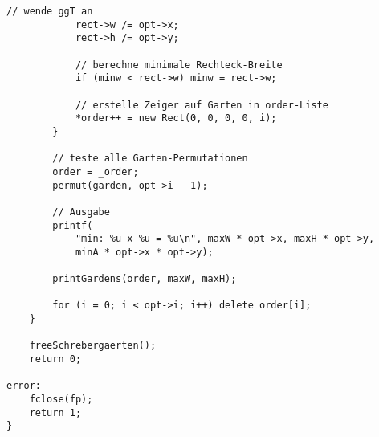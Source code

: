 \documentclass[a4paper,10pt,ngerman]{scrartcl}
\begin{document}
\begin{lstlisting}[frame=single]
            // wende ggT an
            rect->w /= opt->x;
            rect->h /= opt->y;

            // berechne minimale Rechteck-Breite
            if (minw < rect->w) minw = rect->w;

            // erstelle Zeiger auf Garten in order-Liste
            *order++ = new Rect(0, 0, 0, 0, i);
        }

        // teste alle Garten-Permutationen
        order = _order;
        permut(garden, opt->i - 1);

        // Ausgabe
        printf(
            "min: %u x %u = %u\n", maxW * opt->x, maxH * opt->y,
            minA * opt->x * opt->y);

        printGardens(order, maxW, maxH);

        for (i = 0; i < opt->i; i++) delete order[i];
    }

    freeSchrebergaerten();
    return 0;

error:
    fclose(fp);
    return 1;
}

\end{lstlisting}
\end{document}
